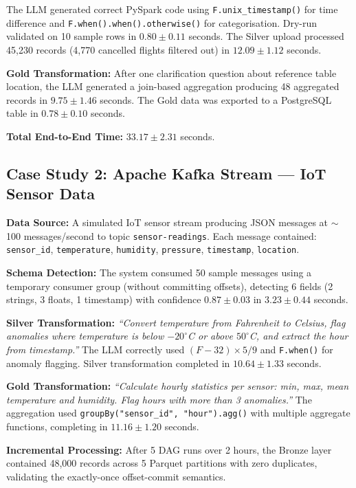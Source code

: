 The LLM generated correct PySpark code using \texttt{F.unix\_timestamp()} for time difference and \texttt{F.when().when().otherwise()} for categorisation. Dry-run validated on 10 sample rows in $0.80 \pm 0.11$ seconds. The Silver upload processed 45,230 records (4,770 cancelled flights filtered out) in $12.09 \pm 1.12$ seconds.

\textbf{Gold Transformation:} After one clarification question about reference table location, the LLM generated a join-based aggregation producing 48 aggregated records in $9.75 \pm 1.46$ seconds. The Gold data was exported to a PostgreSQL table in $0.78 \pm 0.10$ seconds.

\textbf{Total End-to-End Time:} $33.17 \pm 2.31$ seconds.

\subsection{Case Study 2: Apache Kafka Stream --- IoT Sensor Data}

\textbf{Data Source:} A simulated IoT sensor stream producing JSON messages at $\sim$100 messages/second to topic \texttt{sensor-readings}. Each message contained: \texttt{sensor\_id}, \texttt{temperature}, \texttt{humidity}, \texttt{pressure}, \texttt{timestamp}, \texttt{location}.

\textbf{Schema Detection:} The system consumed 50 sample messages using a temporary consumer group (without committing offsets), detecting 6 fields (2 strings, 3 floats, 1 timestamp) with confidence $0.87 \pm 0.03$ in $3.23 \pm 0.44$ seconds.

\textbf{Silver Transformation:} \textit{``Convert temperature from Fahrenheit to Celsius, flag anomalies where temperature is below $-20^\circ$C or above $50^\circ$C, and extract the hour from timestamp.''} The LLM correctly used $(F - 32) \times 5/9$ and \texttt{F.when()} for anomaly flagging. Silver transformation completed in $10.64 \pm 1.33$ seconds.

\textbf{Gold Transformation:} \textit{``Calculate hourly statistics per sensor: min, max, mean temperature and humidity. Flag hours with more than 3 anomalies.''} The aggregation used \texttt{groupBy("sensor\_id", "hour").agg()} with multiple aggregate functions, completing in $11.16 \pm 1.20$ seconds.

\textbf{Incremental Processing:} After 5 DAG runs over 2 hours, the Bronze layer contained 48,000 records across 5 Parquet partitions with zero duplicates, validating the exactly-once offset-commit semantics.


